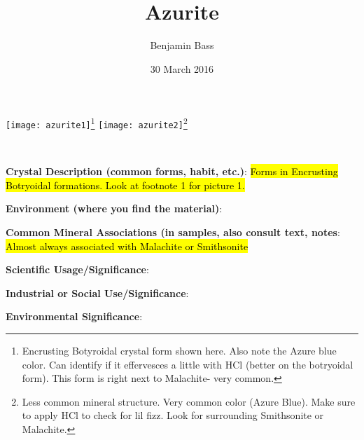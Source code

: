 \documentclass[10pt]{article}
\author{Benjamin Bass}
\date{30 March 2016}
\title{\vspace{-2.0cm}Azurite} %
\begin{document}
\maketitle


\begin{center}
  \texttt{[image: azurite1]}\footnote{Encrusting Botyroidal crystal form shown here. Also note the Azure blue color. Can identify if it effervesces a little with HCl (better on the botryoidal form). This form is right next to Malachite- very common.}
  \texttt{[image: azurite2]}\footnote{Less common mineral structure. Very common color (Azure Blue). Make sure to apply HCl to check for lil fizz. Look for surrounding Smithsonite or Malachite.}
\end{center}



\
\
\
\
\
\
\
\
\
\
\

\begin{framed}
  \textbf{Crystal Description (common forms, habit, etc.)}: \hl{Forms in Encrusting Botryoidal formations. Look at footnote 1 for picture 1.}
\end{framed}

\begin{framed}
  \textbf{Environment (where you find the material)}: 
\end{framed}

\begin{framed}
  \textbf{Common Mineral Associations (in samples, also consult text, notes}: \hl{Almost always associated with Malachite or Smithsonite}
\end{framed}

\begin{framed}
  \textbf{Scientific Usage/Significance}: 
\end{framed}

\begin{framed}
  \textbf{Industrial or Social Use/Significance}: 
\end{framed}

\begin{framed}
  \textbf{Environmental Significance}: 
\end{framed}

\end{document}
